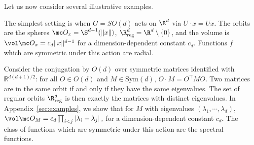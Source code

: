 \documentclass[twoside,a4paper,11pt]{article}
\newcommand{\reg}{\mathrm{reg}}
\theoremstyle{plain}
\begin{document}
Let us now consider several illustrative examples.
\begin{example}
The simplest setting is when $G = SO(d)$
acts on $\R^d$ via $U \cdot x = Ux$.
The orbits are the spheres $\mc O_x = \S^{d -1}(\|x\|)$,
 $\R^d_{\reg} = \R^d\setminus \{0\}$,
and the volume is $\vol \mc O_x = c_d\|x\|^{d - 1}$
for a dimension-dependent constant $c_d$.
Functions $f$ which are symmetric under this
action are radial.
\end{example}
\begin{example}
\label{ex:eigenvalues}
Consider the conjugation by $O(d)$ over symmetric matrices identified with $\mathbb{R}^{d(d+1)/2}$: for all $O \in O(d)$ and $M \in \text{Sym}(d)$, $O \cdot M = O^\top M O$. Two matrices are in the same orbit if and only if they have the same eigenvalues.
The set of regular orbits $\R^d_{\reg}$
is then exactly the matrices with distinct
eigenvalues.
 In Appendix~\ref{sec:examples},
 we show that for $M$ with eigenvalues $(\lambda_1, \cdots, \lambda_d)$, 
$
\vol \mc O_M = c_d \prod_{i<j} |\lambda_i - \lambda_j| \, ,
$
for a dimension-dependent constant $c_d$.
The class of functions which are symmetric under this
action are the spectral functions.
\end{example}
\end{document}
